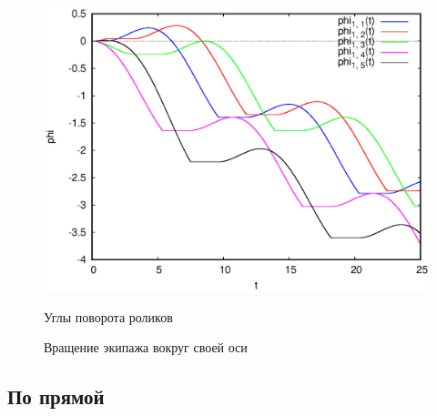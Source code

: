 \begin{figure}[h]
{        \includegraphics[scale=0.33]{pic/self_rot_25/rol_ang.eps}
        \caption{Углы поворота роликов}
        \label{fig:self_rot_25_rol_ang}
    }
    \caption{Вращение экипажа вокруг своей оси}
\end{figure}

\newpage

\subsection{По прямой}

